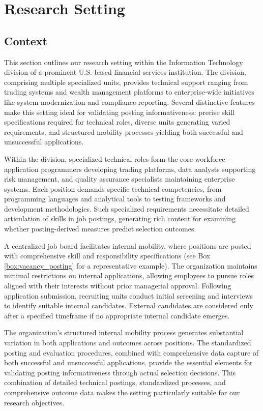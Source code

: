 \section{Research Setting}\label{sec:research_setting}

\subsection{Context}

This section outlines our research setting within the Information Technology division of a prominent U.S.-based financial services institution. The division, 
comprising multiple specialized units, provides technical support ranging from trading systems and wealth management platforms to enterprise-wide initiatives 
like system modernization and compliance reporting. Several distinctive features make this setting ideal for validating posting informativeness: precise skill 
specifications required for technical roles, diverse units generating varied requirements, and structured mobility processes yielding both successful and 
unsuccessful applications.

Within the division, specialized technical roles form the core workforce—application programmers developing trading platforms, data analysts supporting risk management, 
and quality assurance specialists maintaining enterprise systems. Each position demands specific technical competencies, from programming languages and analytical 
tools to testing frameworks and development methodologies. Such specialized requirements necessitate detailed articulation of skills in job postings, generating 
rich content for examining whether posting-derived measures predict selection outcomes.

A centralized job board facilitates internal mobility, where positions are posted with comprehensive skill and responsibility specifications 
(see Box \ref{box:vacancy_posting} for a representative example). The organization maintains minimal restrictions on internal applications, allowing employees 
to pursue roles aligned with their interests without prior managerial approval. Following application submission, recruiting units conduct initial screening and 
interviews to identify suitable internal candidates. External candidates are considered only after a specified timeframe if no appropriate internal candidate emerges.

The organization's structured internal mobility process generates substantial variation in both applications and outcomes across positions. The standardized posting and 
evaluation procedures, combined with comprehensive data capture of both successful and unsuccessful applications, provide the essential elements for validating posting 
informativeness through actual selection decisions. This combination of detailed technical postings, standardized processes, and comprehensive outcome data makes the 
setting particularly suitable for our research objectives.

